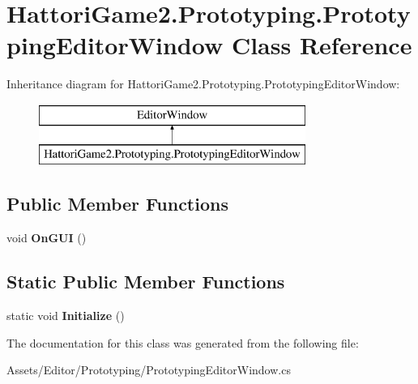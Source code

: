 \hypertarget{class_hattori_game2_1_1_prototyping_1_1_prototyping_editor_window}{}\section{Hattori\+Game2.\+Prototyping.\+Prototyping\+Editor\+Window Class Reference}
\label{class_hattori_game2_1_1_prototyping_1_1_prototyping_editor_window}
Inheritance diagram for Hattori\+Game2.\+Prototyping.\+Prototyping\+Editor\+Window\+:\begin{figure}[H]
\begin{center}
\leavevmode
\includegraphics[height=2.000000cm]{class_hattori_game2_1_1_prototyping_1_1_prototyping_editor_window}
\end{center}
\end{figure}
\subsection*{Public Member Functions}
\begin{DoxyCompactItemize}
\item 
\hypertarget{class_hattori_game2_1_1_prototyping_1_1_prototyping_editor_window_a256ce087320f9aadf02f0060edcf454b}{}void {\bfseries On\+G\+U\+I} ()\label{class_hattori_game2_1_1_prototyping_1_1_prototyping_editor_window_a256ce087320f9aadf02f0060edcf454b}

\end{DoxyCompactItemize}
\subsection*{Static Public Member Functions}
\begin{DoxyCompactItemize}
\item 
\hypertarget{class_hattori_game2_1_1_prototyping_1_1_prototyping_editor_window_ac890ecbd8d3228483087081320fca63e}{}static void {\bfseries Initialize} ()\label{class_hattori_game2_1_1_prototyping_1_1_prototyping_editor_window_ac890ecbd8d3228483087081320fca63e}

\end{DoxyCompactItemize}


The documentation for this class was generated from the following file\+:\begin{DoxyCompactItemize}
\item 
Assets/\+Editor/\+Prototyping/Prototyping\+Editor\+Window.\+cs\end{DoxyCompactItemize}

